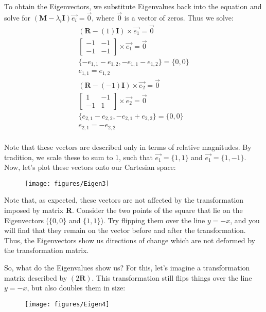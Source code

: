 \documentclass[12pt]{article}
\begin{document}
To obtain the Eigenvectors, we substitute Eigenvalues back into the equation and solve for $(\textbf{M}-\lambda_{i}\textbf{I})\overrightarrow{e_{i}} = \overrightarrow{0}$, where $\overrightarrow{0}$ is a vector of zeros. Thus we solve:
\begin{equation}
\begin{split}
(\textbf{R}-(1)\textbf{I})\times\overrightarrow{e_{1}} = \overrightarrow{0}\\
\begin{bmatrix}
-1 & -1 \\
-1 & -1
\end{bmatrix}
\times\overrightarrow{e_{1}} = \overrightarrow{0}\\
\{-e_{1,1}-e_{1,2}, -e_{1,1}-e_{1,2}\} = \{0,0\}\\
e_{1,1}=e_{1,2}\\
(\textbf{R}-(-1)\textbf{I})\times\overrightarrow{e_{2}} = \overrightarrow{0}\\
\begin{bmatrix}
1 & -1 \\
-1 & 1
\end{bmatrix}
\times\overrightarrow{e_{2}} = \overrightarrow{0}\\
\{e_{2,1}-e_{2,2}, -e_{2,1}+e_{2,2}\} = \{0,0\}\\
e_{2,1}=-e_{2,2}\\
\end{split}
\end{equation}

Note that these vectors are described only in terms of relative magnitudes. By tradition, we scale these to sum to 1, such that $\overrightarrow{e_{1}}=\{1,1\}$ and $\overrightarrow{e_{1}}=\{1,-1\}$. Now, let's plot these vectors onto our Cartesian space:
\begin{figure}[H]
  \centering
  \texttt{[image: figures/Eigen3]}
\end{figure}

Note that, as expected, these vectors are not affected by the transformation imposed by matrix \textbf{R}. Consider the two points of the square that lie on the Eigenvectors ($\{0,0\}$ and $\{1,1\}$). Try flipping them over the line $y=-x$, and you will find that they remain on the vector before and after the transformation. Thus, the Eigenvectors show us directions of change which are not deformed by the transformation matrix.

So, what do the Eigenvalues show us? For this, let's imagine a transformation matrix described by $(2\textbf{R})$. This transformation still flips things over the line $y=-x$, but also doubles them in size:
\begin{figure}[H]
  \centering
  \texttt{[image: figures/Eigen4]}
\end{figure}
\end{document}
